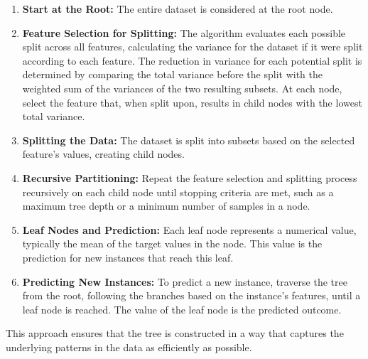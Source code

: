 \begin{enumerate}
    \item \textbf{Start at the Root:} The entire dataset is considered at the root node.
    \item \textbf{Feature Selection for Splitting:} The algorithm evaluates each possible split across all features, calculating the variance for the dataset if it were split according to each feature. The reduction in variance for each potential split is determined by comparing the total variance before the split with the weighted sum of the variances of the two resulting subsets. At each node, select the feature that, when split upon, results in child nodes with the lowest total variance.
    \item \textbf{Splitting the Data:} The dataset is split into subsets based on the selected feature's values, creating child nodes.
    \item \textbf{Recursive Partitioning:} Repeat the feature selection and splitting process recursively on each child node until stopping criteria are met, such as a maximum tree depth or a minimum number of samples in a node.
    \item \textbf{Leaf Nodes and Prediction:} Each leaf node represents a numerical value, typically the mean of the target values in the node. This value is the prediction for new instances that reach this leaf.
    \item \textbf{Predicting New Instances:} To predict a new instance, traverse the tree from the root, following the branches based on the instance's features, until a leaf node is reached. The value of the leaf node is the predicted outcome.
\end{enumerate}

This approach ensures that the tree is constructed in a way that captures the underlying patterns in the data as efficiently as possible.


